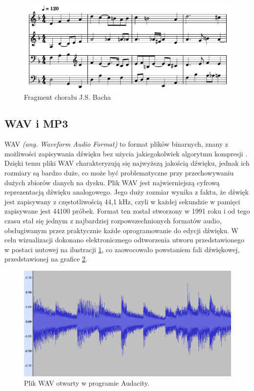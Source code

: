 \documentclass[data-science]{agh-wi} %
\begin{document}
\begin{figure}
    \begin{center}
        \includegraphics[width=0.9\linewidth]{./img/jsb_7_sheet.pdf}
    \end{center}
    \caption{Fragment chorału J.S. Bacha}\label{fig:jsb_sheet}
\end{figure}
\subsection{WAV i MP3}
WAV \textit{(ang. Waveform Audio Format)} to format plików binarnych, znany z możliwości zapisywania dźwięku bez użycia jakiegokolwiek algorytmu kompresji \cite{wav_specification}. Dzięki temu pliki WAV charakteryzują się najwyższą jakością dźwięku, jednak ich rozmiary są bardzo duże, co może być problematyczne przy przechowywaniu dużych zbiorów danych na dysku. Plik WAV jest najwierniejszą cyfrową reprezentacją dźwięku analogowego. Jego duży rozmiar wynika z faktu, że dźwięk jest zapisywany z częstotliwością 44,1 kHz, czyli w każdej sekundzie w pamięci zapisywane jest 44100 próbek. Format ten został stworzony w 1991 roku i od tego czasu stał się jednym z najbardziej rozpowszechnionych formatów audio, obsługiwanym przez praktycznie każde oprogramowanie do edycji dźwięku. W celu wizualizacji dokonano elektronicznego odtworzenia utworu przedstawionego w postaci nutowej na ilustracji \ref*{fig:jsb_sheet}, co zaowocowało powstaniem fali dźwiękowej, przedstawionej na grafice \ref*{fig:jsb_wav}.

\begin{figure}
    \begin{center}
        \includegraphics[width=\linewidth]{./img/jsb_wav.png}
    \end{center}
    \caption{Plik WAV otwarty w programie Audacity.}\label{fig:jsb_wav}
\end{figure}
\end{document}
